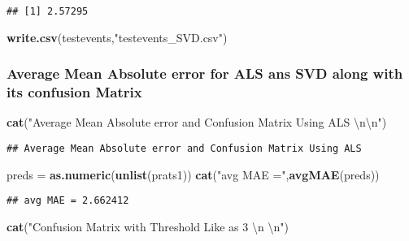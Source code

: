 \documentclass[]{article}
\newenvironment{Shaded}{\begin{snugshade}}{\end{snugshade}}
\newcommand{\CharTok}[1]{\textcolor[rgb]{0.31,0.60,0.02}{#1}}
\newcommand{\KeywordTok}[1]{\textcolor[rgb]{0.13,0.29,0.53}{\textbf{#1}}}
\newcommand{\NormalTok}[1]{#1}
\newcommand{\StringTok}[1]{\textcolor[rgb]{0.31,0.60,0.02}{#1}}
\begin{document}
\begin{verbatim}
## [1] 2.57295
\end{verbatim}

\begin{Shaded}
\begin{Highlighting}[]
\KeywordTok{write.csv}\NormalTok{(testevents,}\StringTok{"testevents_SVD.csv"}\NormalTok{)}
\end{Highlighting}
\end{Shaded}

\hypertarget{average-mean-absolute-error-for-als-ans-svd-along-with-its-confusion-matrix}{%
\subsubsection{Average Mean Absolute error for ALS ans SVD along with
its confusion
Matrix}\label{average-mean-absolute-error-for-als-ans-svd-along-with-its-confusion-matrix}}

\begin{Shaded}
\begin{Highlighting}[]
\KeywordTok{cat}\NormalTok{(}\StringTok{"Average Mean Absolute error and Confusion Matrix Using ALS }\CharTok{\textbackslash{}n\textbackslash{}n}\StringTok{"}\NormalTok{)}
\end{Highlighting}
\end{Shaded}

\begin{verbatim}
## Average Mean Absolute error and Confusion Matrix Using ALS
\end{verbatim}

\begin{Shaded}
\begin{Highlighting}[]
\NormalTok{preds =}\StringTok{ }\KeywordTok{as.numeric}\NormalTok{(}\KeywordTok{unlist}\NormalTok{(prats1))}
\KeywordTok{cat}\NormalTok{(}\StringTok{"avg MAE ="}\NormalTok{,}\KeywordTok{avgMAE}\NormalTok{(preds))}
\end{Highlighting}
\end{Shaded}

\begin{verbatim}
## avg MAE = 2.662412
\end{verbatim}

\begin{Shaded}
\begin{Highlighting}[]
\KeywordTok{cat}\NormalTok{(}\StringTok{"Confusion Matrix with Threshold Like as 3 }\CharTok{\textbackslash{}n}\StringTok{ }\CharTok{\textbackslash{}n}\StringTok{"}\NormalTok{)}
\end{Highlighting}
\end{Shaded}
\end{document}
